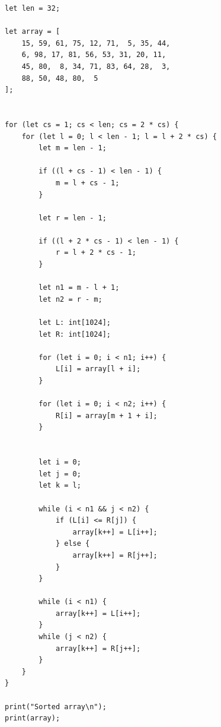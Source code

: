 \documentclass[a4paper]{article}
\begin{document}
\begin{lstlisting}[language=DPL]
let len = 32;

let array = [
    15, 59, 61, 75, 12, 71,  5, 35, 44,
    6, 98, 17, 81, 56, 53, 31, 20, 11,
    45, 80,  8, 34, 71, 83, 64, 28,  3,
    88, 50, 48, 80,  5
];


for (let cs = 1; cs < len; cs = 2 * cs) {
    for (let l = 0; l < len - 1; l = l + 2 * cs) {
        let m = len - 1;

        if ((l + cs - 1) < len - 1) {
            m = l + cs - 1;
        }

        let r = len - 1;

        if ((l + 2 * cs - 1) < len - 1) {
            r = l + 2 * cs - 1;
        }

        let n1 = m - l + 1;
        let n2 = r - m;

        let L: int[1024];
        let R: int[1024];

        for (let i = 0; i < n1; i++) {
            L[i] = array[l + i];
        }

        for (let i = 0; i < n2; i++) {
            R[i] = array[m + 1 + i];
        }


        let i = 0;
        let j = 0;
        let k = l;

        while (i < n1 && j < n2) {
            if (L[i] <= R[j]) {
                array[k++] = L[i++];
            } else {
                array[k++] = R[j++];
            }
        }

        while (i < n1) {
            array[k++] = L[i++];
        }
        while (j < n2) {
            array[k++] = R[j++];
        }
    }
}

print("Sorted array\n");
print(array);
\end{lstlisting}


%

%
\end{document}
